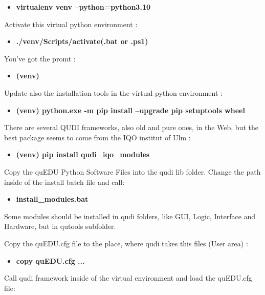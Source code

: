\begin{itemize}
	\item \textbf{virtualenv venv --python=python3.10}
\end{itemize}

Activate this virtual python environment :
 
\begin{itemize}
 	\item \textbf{ ./\/venv/\/Scripts/\/activate(.bat or .ps1)}
\end{itemize}
 
You’ve got the promt :
 
\begin{itemize}
 	\item \textbf{(venv)}
\end{itemize}
  
Update also the installation tools in the virtual python environment :
  
\begin{itemize}
	\item \textbf{(venv) python.exe -m pip install --upgrade pip setuptools wheel}
\end{itemize}
 
There are several QUDI frameworks, also old and pure ones, in the Web, but the best package seems to come from the IQO institut of Ulm  :

\begin{itemize}
	\item \textbf{ (venv) pip install qudi\_iqo\_modules}
\end{itemize}

Copy the quEDU Python Software Files into the qudi lib folder. Change the path inside of the install batch file and call:

\begin{itemize}
	\item \textbf{install\_modules.bat}
\end{itemize}

Some modules should be installed in qudi folders, like GUI, Logic, Interface and Hardware, but in qutools subfolder.

Copy the quEDU.cfg file to the place, where qudi takes this files (User area)  :

\begin{itemize}
	\item \textbf{copy quEDU.cfg ...}
\end{itemize}

Call qudi framework inside of the virtual environment and load the quEDU.cfg file:

